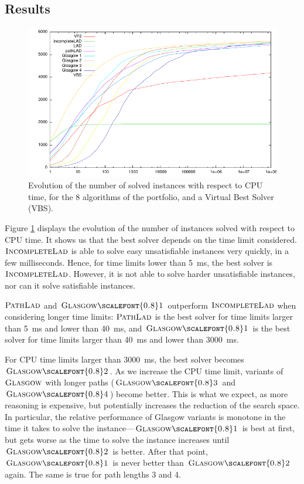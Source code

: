 \documentclass{llncs}
\newcommand{\Glasgow}{$\textsc{Glasgow}$\xspace}
\newcommand{\IncompleteLAD}{$\textsc{IncompleteLad}$\xspace}
\newcommand{\PathLAD}{$\textsc{PathLad}$\xspace}
\newcommand{\GlasgowOne}{$\textsc{Glasgow{\scalefont{0.8}1}}$\xspace}
\newcommand{\GlasgowTwo}{$\textsc{Glasgow{\scalefont{0.8}2}}$\xspace}
\newcommand{\GlasgowThree}{$\textsc{Glasgow{\scalefont{0.8}3}}$\xspace}
\newcommand{\GlasgowFour}{$\textsc{Glasgow{\scalefont{0.8}4}}$\xspace}
\begin{document}
\subsection{Results} \label{expComp}

\begin{figure}[t]
\includegraphics[width=\textwidth]{courbe.pdf}
\caption{Evolution of the number of solved instances with respect to CPU time, for the 8 algorithms
of the portfolio, and a Virtual Best Solver (VBS).\label{expTimeGraph}}
\end{figure}

Figure \ref{expTimeGraph} displays the evolution of the number of instances solved with respect to
CPU time. It shows us that the best solver depends on the time limit considered. \IncompleteLAD is
able to solve easy unsatisfiable instances very quickly, in a few milliseconds. Hence, for time
limits lower than \SI{5}{\ms}, the best solver is \IncompleteLAD. However, it is not able to solve harder
unsatisfiable instances, nor can it solve satisfiable instances.

\PathLAD and \GlasgowOne outperform \IncompleteLAD when considering longer time limits: \PathLAD is the
best solver for time limits larger than \SI{5}{\ms} and lower than \SI{40}{\ms}, and \GlasgowOne is the best solver
for time limits larger than \SI{40}{\ms} and lower than \SI{3000}{\ms}.

For CPU time limits larger than \SI{3000}{\ms}, the best solver becomes \GlasgowTwo.  As we
increase the CPU time limit, variants of \Glasgow with longer paths (\GlasgowThree and \GlasgowFour)
become better. This is what we expect, as more reasoning is expensive, but potentially increases the
reduction of the search space. In particular, the relative performance of Glasgow variants is
monotone in the time it takes to solve the instance---\GlasgowOne is best at first, but gets worse as
the time to solve the instance increases until \GlasgowTwo is better. After that point, \GlasgowOne is
never better than \GlasgowTwo again. The same is true for path lengths 3 and 4.
\end{document}
